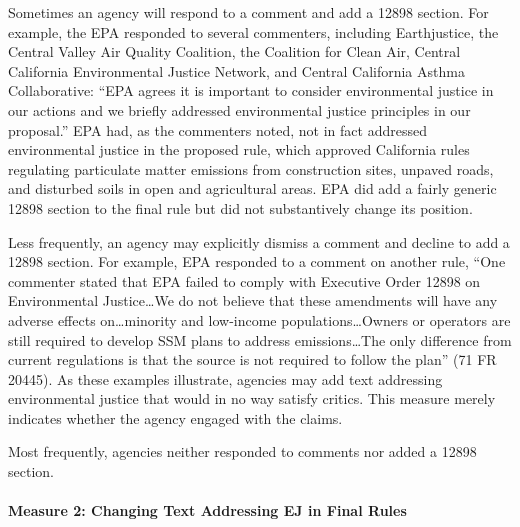 \documentclass[
      12pt,
        ]{article}
\begin{document}
Sometimes an agency will respond to a comment and add a 12898 section. For example, the EPA responded to several commenters, including Earthjustice, the Central Valley Air Quality Coalition, the Coalition for Clean Air, Central California Environmental Justice Network, and Central California Asthma Collaborative: ``EPA agrees it is important to consider environmental justice in our actions and we briefly addressed environmental justice principles in our proposal.'' EPA had, as the commenters noted, not in fact addressed environmental justice in the proposed rule, which approved California rules regulating particulate matter emissions from construction sites, unpaved roads, and disturbed soils in open and agricultural areas. EPA did add a fairly generic 12898 section to the final rule but did not substantively change its position.

Less frequently, an agency may explicitly dismiss a comment and decline to add a 12898 section. For example, EPA responded to a comment on another rule, ``One commenter stated that EPA failed to comply with Executive Order 12898 on Environmental Justice\ldots We do not believe that these amendments will have any adverse effects on\ldots minority and low-income populations\ldots Owners or operators are still required to develop SSM plans to address emissions\ldots The only difference from current regulations is that the source is not required to follow the plan'' (71 FR 20445). As these examples illustrate, agencies may add text addressing environmental justice that would in no way satisfy critics. This measure merely indicates whether the agency engaged with the claims.

Most frequently, agencies neither responded to comments nor added a 12898 section.

\hypertarget{measure-2-changing-text-addressing-ej-in-final-rules}{%
\paragraph{Measure 2: Changing Text Addressing EJ in Final Rules}\label{measure-2-changing-text-addressing-ej-in-final-rules}}
\end{document}
